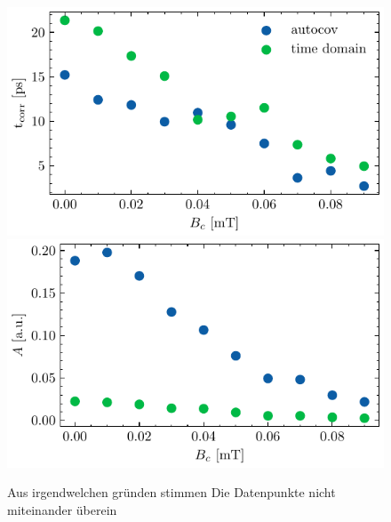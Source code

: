 \documentclass[main.tex]{subfiles}
\begin{document}
\begin{figure}[H]
    \centering
    \includegraphics{bilder/plots/max_Bz/t_corr.pdf}
    \includegraphics{bilder/plots/max_Bz/amplitude_corr.pdf}
    \caption{Aus irgendwelchen gründen stimmen Die Datenpunkte nicht miteinander überein }\label{fig:bz-autocorr-amplitude}
\end{figure}
\end{document}
